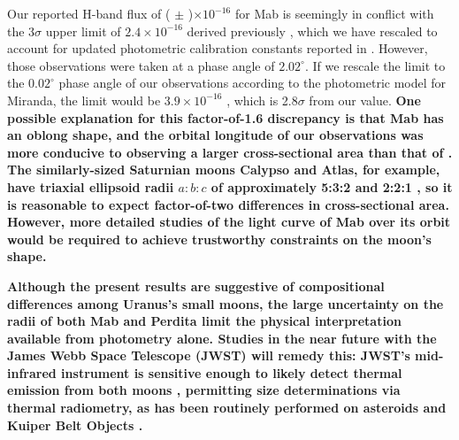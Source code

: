 \documentclass[preprint]{aastex631}
\begin{document}
Our reported H-band flux of 
( $\pm$ )$\times10^{-16}$ \ergsec{} 
for Mab is seemingly in conflict with the 3$\sigma$ upper limit of $2.4 \times 10^{-16}$ \ergsec{} derived previously \citep[][]{paradis19}, which we have rescaled to account for updated photometric calibration constants reported in \citet{paradis23}. However, those observations were taken at a phase angle of $2.02^\circ$. If we rescale the limit to the $0.02^\circ$ phase angle of our observations according to the \citet{karkoschka01} photometric model for Miranda, the limit would be $3.9 \times 10^{-16}$ \ergsec{}, which is 2.8$\sigma$ from our value. \textbf{One possible explanation for this factor-of-1.6 discrepancy is that Mab has an oblong shape, and the orbital longitude of our observations was more conducive to observing a larger cross-sectional area than that of \citet{paradis19}. The similarly-sized Saturnian moons Calypso and Atlas, for example, have triaxial ellipsoid radii $a:b:c$ of approximately 5:3:2 and 2:2:1 \citep{thomas20}, so it is reasonable to expect factor-of-two differences in cross-sectional area. However, more detailed studies of the light curve of Mab over its orbit would be required to achieve trustworthy constraints on the moon's shape.}

\textbf{
Although the present results are suggestive of compositional differences among Uranus's small moons, the large uncertainty on the radii of both Mab and Perdita limit the physical interpretation available from photometry alone. Studies in the near future with the James Webb Space Telescope (JWST) will remedy this: JWST's mid-infrared instrument is sensitive enough to likely detect thermal emission from both moons \citep{wright23}, permitting size determinations via thermal radiometry, as has been routinely performed on asteroids and Kuiper Belt Objects \citep[see][for definition and examples of this technique]{muller02, stansberry08, vilenius18}. }



\end{document}
